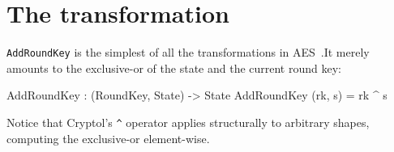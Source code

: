 
\section{The {} transformation}
\label{sec:ttfam-addr-transf}

{\tt AddRoundKey} is the simplest of all the transformations in
AES~\cite[Section 5.1.4]{aes}.\indAES It merely amounts to the
exclusive-or of the state and the current round key:\indXOr
\begin{code}
  AddRoundKey : (RoundKey, State) -> State
  AddRoundKey (rk, s) = rk ^ s
\end{code}
Notice that Cryptol's {\tt \Verb|^|} operator applies structurally to
arbitrary shapes, computing the exclusive-or element-wise.

